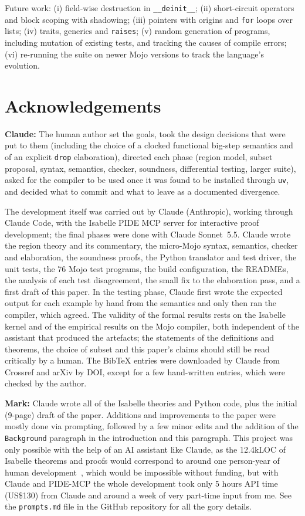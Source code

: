 \documentclass[11pt,a4paper]{article}
\newcommand{\micro}{micro-Mojo}
\newcommand{\code}[1]{\texttt{#1}}
\begin{document}
Future work: (i) field-wise destruction in \code{\_\_deinit\_\_}; (ii) short-circuit
operators and block scoping with shadowing; (iii) pointers with origins and
\code{for} loops over lists; (iv) traits, generics and \code{raises}; (v) random
generation of programs, including mutation of existing tests, and tracking the
causes of compile errors; (vi) re-running the suite on newer Mojo versions to
track the language's evolution.

\section*{Acknowledgements}

\textbf{Claude:} The human author set the goals, took the design decisions that were put to them
(including the choice of a clocked functional big-step semantics and of an
explicit \code{drop} elaboration), directed each phase (region model,
subset proposal, syntax, semantics, checker, soundness, differential testing,
larger suite), asked for the compiler to be used once it was found to be
installed through \code{uv}, and decided what to commit and what to leave as a
documented divergence.

The development itself was carried out by Claude (Anthropic), working through
Claude Code, with the Isabelle PIDE MCP server for interactive proof
development; the final phases were done with Claude Sonnet~5.5. Claude wrote the
region theory and its commentary, the \micro{} syntax, semantics, checker and
elaboration, the soundness proofs, the Python translator and test driver, the
unit tests, the 76 Mojo test programs, the build configuration, the READMEs, the
analysis of each test disagreement, the small fix to the elaboration pass, and a
first draft of this paper. In the testing phase, Claude first wrote the expected output
for each example by hand from the semantics and only then ran the compiler, which
agreed. The validity of the formal results rests on the Isabelle kernel and
of the empirical results on the Mojo compiler, both independent of the
assistant that produced the artefacts; the statements of the definitions
and theorems, the choice of subset and this paper's claims should still be
read critically by a human. The BibTeX entries were downloaded by Claude from
Crossref and arXiv by DOI, except for a few hand-written entries,
which were checked by the author.

\textbf{Mark:} Claude wrote all of the Isabelle theories and Python code,
plus the initial (9-page) draft of the paper.  Additions and improvements to
the paper were mostly done via prompting, followed by a few minor edits and the
addition of the \texttt{Background} paragraph in the introduction and this paragraph.
This project was only possible with the help of an AI assistant like Claude, as the
12.4kLOC of Isabelle theorems and proofs would correspond to around one person-year
of human development~\cite{Staples:2014:PPE}, which would be impossible without funding,
but with Claude and PIDE-MCP the whole development took only 5 hours API time (US\$130) 
from Claude and around a week of very part-time input from me.  See the \code{prompts.md}
file in the GitHub repository \cite{mojo-semantics} for all the gory details.

\begin{small}


\end{small}
\end{document}
